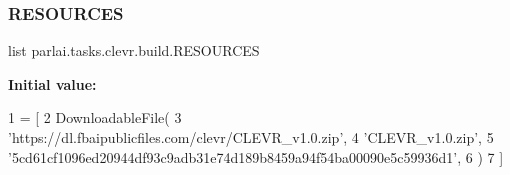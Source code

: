 \subsubsection{\texorpdfstring{R\+E\+S\+O\+U\+R\+C\+ES}{RESOURCES}}
{\footnotesize\ttfamily list parlai.\+tasks.\+clevr.\+build.\+R\+E\+S\+O\+U\+R\+C\+ES}

{\bfseries Initial value\+:}
\begin{DoxyCode}
1 =  [
2     DownloadableFile(
3         \textcolor{stringliteral}{'https://dl.fbaipublicfiles.com/clevr/CLEVR\_v1.0.zip'},
4         \textcolor{stringliteral}{'CLEVR\_v1.0.zip'},
5         \textcolor{stringliteral}{'5cd61cf1096ed20944df93c9adb31e74d189b8459a94f54ba00090e5c59936d1'},
6     )
7 ]
\end{DoxyCode}
